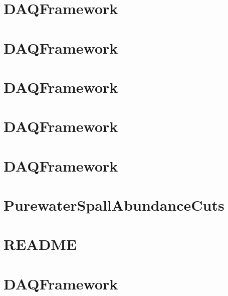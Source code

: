 \let\mypdfximage\pdfximage\def\pdfximage{\immediate\mypdfximage}\documentclass[twoside]{book}
\newcommand{\+}{\discretionary{\mbox{\scriptsize$\hookleftarrow$}}{}{}}
\begin{document}
\chapter{DAQFramework}
\label{md_UserTools_PostLoweReconstructionCuts_README}

\chapter{DAQFramework}
\label{md_UserTools_PostReconstructionNeutronCloudSelection_README}

\chapter{DAQFramework}
\label{md_UserTools_PreLoweReconstructionCuts_README}

\chapter{DAQFramework}
\label{md_UserTools_PreReconstructionNeutronCloudSelection_README}

\chapter{DAQFramework}
\label{md_UserTools_PrintEvent_README}

\chapter{Purewater\+Spall\+Abundance\+Cuts}
\label{md_UserTools_PurewaterSpallAbundanceCuts_README}

\chapter{README}
\label{md_UserTools_ReadMCInfo_README}

\chapter{DAQFramework}
\label{md_UserTools_ReadMCParticles_README}

\end{document}
